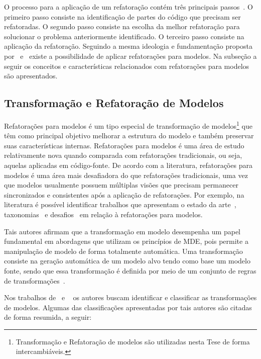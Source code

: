 O processo para a aplicação de um refatoração contém três principais passos~\cite{Wake_2003}. O primeiro passo consiste na identificação de partes do código que precisam ser refatoradas. O segundo passo consiste na escolha da melhor refatoração para solucionar o problema anteriormente identificado. O terceiro passo consiste na aplicação da refatoração. Seguindo a mesma ideologia e fundamentação proposta por~ e~ existe a possibilidade de aplicar refatorações para modelos. Na subseção a seguir os conceitos e características relacionados com refatorações para modelos são apresentados.


\subsection{Transformação e Refatoração de Modelos}\label{sec:transformacoes_de_modelos}

Refatorações para modelos é um tipo especial de transformação de modelos\footnote{Transformação e Refatoração de modelos são utilizadas nesta Tese de forma intercambiáveis.} que têm como principal objetivo melhorar a estrutura do modelo e também preservar suas características internas. Refatorações para modelos é uma área de estudo relativamente nova quando comparada com refatorações tradicionais, ou seja, aquelas aplicadas em código-fonte. De acordo com a literatura, refatorações para modelos é uma área mais desafiadora do que refatorações tradicionais, uma vez que modelos usualmente possuem múltiplas visões que precisam permanecer sincronizados e consistentes após a aplicação de refatorações. Por exemplo, na literatura é possível identificar trabalhos que apresentam o estado da arte~\cite{Tom_2008_2008}, taxonomias~\cite{Maddeh_2010} e desafios~\cite{mens_03_refactoring, Mens07RefacTools, Van_Der_Straeten_2009, mens2003refactoring_novo_rafa} em relação à refatorações para modelos. 

Tais autores afirmam que a transformação em modelo desempenha um papel fundamental em abordagens que utilizam os princípios de MDE, pois permite a manipulação de modelo de forma totalmente automática. Uma transformação consiste na geração automática de um modelo alvo tendo como base um modelo fonte, sendo que essa transformação é definida por meio de um conjunto de regras de transformações~\cite{Mens_2006}. 

Nos trabalhos de~ e ~ os autores buscam identificar e classificar as transformações de modelos. Algumas das classificações apresentadas por tais autores são citadas de forma resumida, a seguir:

